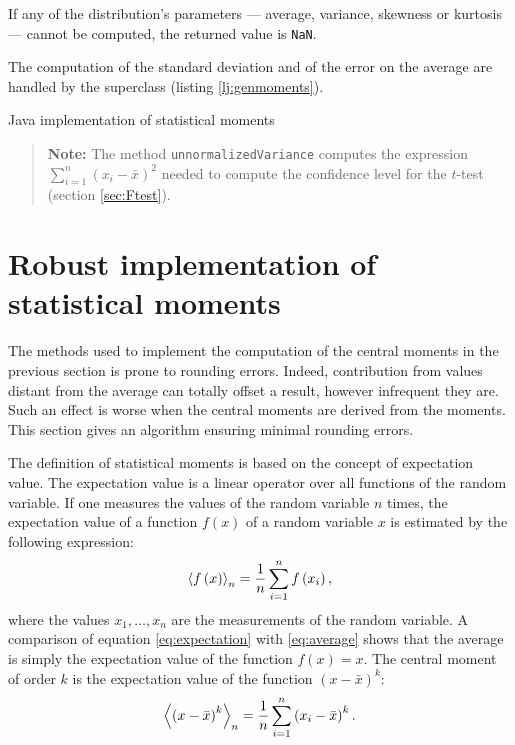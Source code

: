 \documentclass[twoside]{book}
\begin{document}
If any of the distribution's parameters --- average, variance,
skewness or kurtosis --- cannot be computed, the returned value is
{\tt NaN}.

The computation of the standard deviation and of the error on the
average are handled by the superclass (\cf listing
\ref{lj:genmoments}).
\begin{listing} Java implementation of statistical moments \label{lj:moments}

\end{listing}
\begin{quote}
{\bf Note:} The method {\tt unnormalizedVariance} computes the
expression $\sum_{i=1}^n\left(x_i-\bar{x}\right)^2$ needed to
compute the confidence level for the $t$-test (\cf section
\ref{sec:Ftest}).
\end{quote}

\section{Robust implementation of statistical moments}
\label{sec:robustmoment} The methods used to implement the
computation of the central moments in the previous section is
prone to rounding errors. Indeed, contribution from values distant
from the average can totally offset a result, however infrequent
they are. Such an effect is worse when the central moments are
derived from the moments. This section gives an algorithm ensuring
minimal rounding errors.

The definition of statistical moments is based on the concept of
expectation value. The expectation value is a linear operator over
all functions of the random variable. If one measures the values
of the random variable $n$ times, the expectation value of a
function $f\left(x\right)$ of a random variable $x$ is estimated
by the following expression:
\begin{equation}
\label{eq:expectation}
 \left\langle f\left(x\right)\right\rangle_n
= {1\over n}\sum_{i=1}^n f\left(x_i\right),
\end{equation}
where the values $x_1,\ldots,x_n$ are the measurements of the
random variable. A comparison of equation \ref{eq:expectation}
with \ref{eq:average} shows that the average is simply the
expectation value of the function $f\left(x\right)=x$. The central
moment of order $k$ is the expectation value of the function
$\left(x-\bar{x}\right)^k$:
\begin{equation}
\label{eq:expectmoment}
 \left\langle \left(x-\bar{x}\right)^k\right\rangle_n
= {1\over n}\sum_{i=1}^n \left(x_i-\bar{x}\right)^k.
\end{equation}
\end{document}
